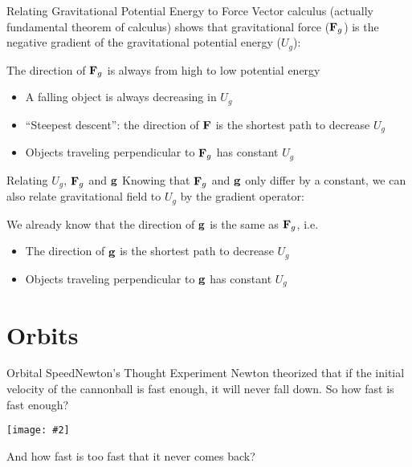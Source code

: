 \documentclass[12pt,compress,aspectratio=169]{beamer}
\newcommand{\pic}[2]{\texttt{[image: \#2]}}
\newcommand{\mb}[1]{\ensuremath\mathbf{#1}}
\newcommand{\eq}[2]{\vspace{#1}{\Large\begin{displaymath}#2\end{displaymath}}}
\begin{document}
\begin{frame}{Relating Gravitational Potential Energy to Force}
  Vector calculus (actually fundamental theorem of calculus) shows that
  gravitational force ($\mb{F}_g$) is the negative gradient of the
  gravitational potential energy ($U_g$):
  
  \eq{-.1in}{
    \mb{F}_g=-\nabla U_g=
    -\frac{\partial U_g}{\partial r}\hat{\mb{r}}
  }

  The direction of $\mb{F}_g$ is always from high to low potential energy
  \begin{itemize}
  \item A falling object is always decreasing in $U_g$
  \item ``Steepest descent'': the direction of $\mb{F}$ is the shortest path
    to decrease $U_g$ 
  \item Objects traveling perpendicular to $\mb{F}_g$ has constant $U_g$
  \end{itemize}
\end{frame}


\begin{frame}{Relating $U_g$, $\mb{F}_g$ and $\mb{g}$}
  Knowing that $\mb{F}_g$ and $\mb{g}$ only differ by a constant, we can
  also relate gravitational field to $U_g$ by the gradient operator:

  \eq{-.1in}{
    \mb{g}=\frac{\mb{F}_g}{m}=-\nabla\left(\frac{U_g}{m}\right)=
    -\frac{\partial}{\partial r}\left(\frac{U_g}{m}\right)
    \hat{\mb{r}}
  }

  We already know that the direction of $\mb{g}$ is the same as $\mb{F}_g$,
  i.e.
  \begin{itemize}
  \item The direction of $\mb{g}$ is the shortest path to decrease $U_g$ 
  \item Objects traveling perpendicular to $\mb{g}$ has constant $U_g$
  \end{itemize}
\end{frame}



\section{Orbits}

\begin{frame}{Orbital Speed}{Newton's Thought Experiment}
  Newton theorized that if the initial velocity of the cannonball is fast
  enough, it will never fall down. So how fast is fast enough?
  \begin{center}
    \pic{.8}{figure-5.jpg}
  \end{center}
  And how fast is too fast that it never comes back?
\end{frame}
\end{document}
